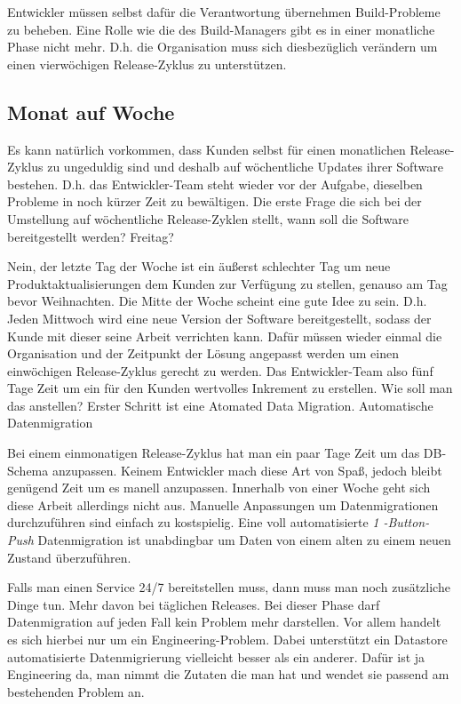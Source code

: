 Entwickler müssen selbst dafür die Verantwortung übernehmen Build-Probleme zu
beheben. Eine Rolle wie die des Build-Managers gibt es in einer monatliche
Phase nicht mehr. D.h. die Organisation muss sich diesbezüglich verändern um
einen vierwöchigen Release-Zyklus zu unterstützen.


\subsection{Monat auf Woche}
\label{subsec:monat-auf-woche}

Es kann natürlich vorkommen, dass Kunden selbst für einen monatlichen Release-
Zyklus zu ungeduldig sind und deshalb auf wöchentliche Updates ihrer Software
bestehen. D.h. das Entwickler-Team steht wieder vor der Aufgabe, dieselben
Probleme in noch kürzer Zeit zu bewältigen. Die erste Frage die sich bei der
Umstellung auf wöchentliche Release-Zyklen stellt, wann soll die Software
bereitgestellt werden? Freitag?

Nein, der letzte Tag der Woche ist ein äußerst schlechter Tag um neue
Produktaktualisierungen dem Kunden zur Verfügung zu stellen, genauso am Tag
bevor Weihnachten. Die Mitte der Woche scheint eine gute Idee zu sein. D.h.
Jeden Mittwoch wird eine neue Version der Software bereitgestellt, sodass der
Kunde mit dieser seine Arbeit verrichten kann. Dafür müssen wieder einmal die
Organisation und der Zeitpunkt der Lösung angepasst werden um einen
einwöchigen Release-Zyklus gerecht zu werden. Das Entwickler-Team also fünf
Tage Zeit um ein für den Kunden wertvolles Inkrement zu erstellen. Wie soll
man das anstellen? Erster Schritt ist eine Atomated Data Migration.
Automatische Datenmigration

Bei einem einmonatigen Release-Zyklus hat man ein paar Tage Zeit um das DB-
Schema anzupassen. Keinem Entwickler mach diese Art von Spaß, jedoch bleibt
genügend Zeit um es manell anzupassen. Innerhalb von einer Woche geht sich
diese Arbeit allerdings nicht aus. Manuelle Anpassungen um Datenmigrationen
durchzuführen sind einfach zu kostspielig. Eine voll automatisierte \emph{1
-Button-Push} Datenmigration ist unabdingbar um Daten von einem alten zu einem
neuen Zustand überzuführen.

Falls man einen Service 24/7 bereitstellen muss, dann muss man noch
zusätzliche Dinge tun. Mehr davon bei täglichen Releases. Bei dieser Phase
darf Datenmigration auf jeden Fall kein Problem mehr darstellen. Vor allem
handelt es sich hierbei nur um ein Engineering-Problem. Dabei unterstützt ein
Datastore automatisierte Datenmigrierung vielleicht besser als ein anderer.
Dafür ist ja Engineering da, man nimmt die Zutaten die man hat und wendet sie
passend am bestehenden Problem an.

